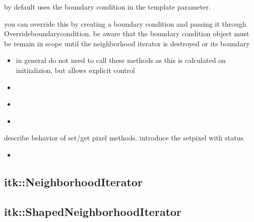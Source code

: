 % 


by default uses the boundary condition in the template parameter.

you can override this by creating a boundary condition and passing it through
Overrideboundarycondition.  be aware that the boundary condition object must be
remain in scope until the neighborhood iterator is destroyed or its boundary
 

\begin{itemize}
\item \textbf{} in general do not
need to call these methods as this is calculated on initiializion, but allows
explicit control
\item \textbf{} 
\item \textbf{} 
\item \textbf{} 
\end{itemize}

describe behavior of set/get pixel methods.  introduce the setpixel with status
\begin{itemize}
\item \textbf{} 
\end{itemize}



\subsection{itk::NeighborhoodIterator}
\label{sec:itkNeighborhoodIterator}

% 


\subsection{itk::ShapedNeighborhoodIterator}
\label{sec:itkShapedNeighborhoodIterator}


